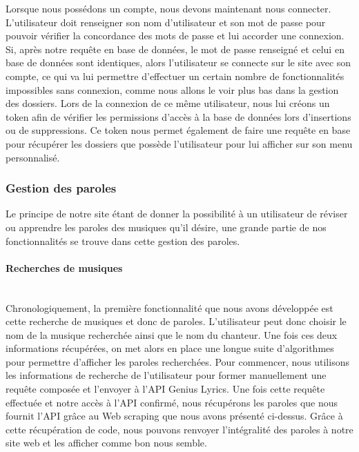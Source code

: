 \documentclass[12pt,french]{article}
\begin{document}
Lorsque nous possédons un compte, nous devons maintenant nous connecter. L'utilisateur doit renseigner son nom d'utilisateur et son mot de passe pour pouvoir vérifier la concordance des mots de passe et lui accorder une connexion. Si, après notre requête en base de données, le mot de passe renseigné et celui en base de données sont identiques, alors l'utilisateur se connecte sur le site avec son compte, ce qui va lui permettre d'effectuer un certain nombre de fonctionnalités impossibles sans connexion, comme nous allons le voir plus bas dans la gestion des dossiers. Lors de la connexion de ce même utilisateur, nous lui créons un \gls{token} afin de vérifier les permissions d'accès à la base de données lors d'insertions ou de suppressions. Ce \gls{token} nous permet également de faire une requête en base pour récupérer les dossiers que possède l'utilisateur pour lui afficher sur son menu personnalisé.

\subsubsection{Gestion des paroles}

Le principe de notre site étant de donner la possibilité à un utilisateur de réviser ou apprendre les paroles des musiques qu'il désire, une grande partie de nos fonctionnalités se trouve dans cette gestion des paroles. 

\paragraph{Recherches de musiques \\\\}

Chronologiquement, la première fonctionnalité que nous avons développée est cette recherche de musiques et donc de paroles. L'utilisateur peut donc choisir le nom de la musique recherchée ainsi que le nom du chanteur. Une fois ces deux informations récupérées, on met alors en place une longue suite d'algorithmes pour permettre d'afficher les paroles recherchées. Pour commencer, nous utilisons les informations de recherche de l'utilisateur pour former manuellement une requête composée et l'envoyer à l'\gls{API} Genius Lyrics. Une fois cette requête effectuée et notre accès à l'\gls{API} confirmé, nous récupérons les paroles que nous fournit l'\gls{API} grâce au \gls{Web scraping} que nous avons présenté ci-dessus. Grâce à cette récupération de code, nous pouvons renvoyer l'intégralité des paroles à notre site web et les afficher comme bon nous semble.
\end{document}
